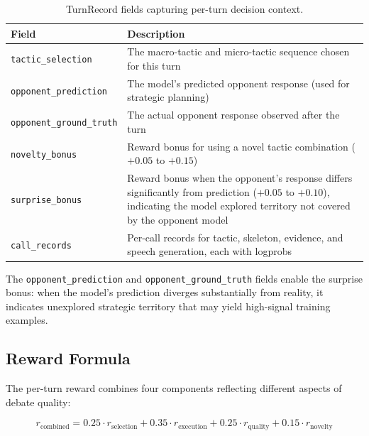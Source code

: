 \begin{table}[h]
\centering
\small
\begin{tabular}{lp{8cm}}
\toprule
\textbf{Field} & \textbf{Description} \\
\midrule
\texttt{tactic\_selection} & The macro-tactic and micro-tactic sequence chosen for this turn \\
\texttt{opponent\_prediction} & The model's predicted opponent response (used for strategic planning) \\
\texttt{opponent\_ground\_truth} & The actual opponent response observed after the turn \\
\texttt{novelty\_bonus} & Reward bonus for using a novel tactic combination ($+0.05$ to $+0.15$) \\
\texttt{surprise\_bonus} & Reward bonus when the opponent's response differs significantly from prediction ($+0.05$ to $+0.10$), indicating the model explored territory not covered by the opponent model \\
\texttt{call\_records} & Per-call records for tactic, skeleton, evidence, and speech generation, each with logprobs \\
\bottomrule
\end{tabular}
\caption{TurnRecord fields capturing per-turn decision context.}
\label{tab:turn_record}
\end{table}

The \texttt{opponent\_prediction} and \texttt{opponent\_ground\_truth}
fields enable the surprise bonus: when the model's prediction diverges
substantially from reality, it indicates unexplored strategic territory
that may yield high-signal training examples.

\subsection{Reward Formula}

The per-turn reward combines four components reflecting different aspects
of debate quality:

\begin{equation}
r_{\text{combined}} = 0.25 \cdot r_{\text{selection}} + 0.35 \cdot r_{\text{execution}} + 0.25 \cdot r_{\text{quality}} + 0.15 \cdot r_{\text{novelty}}
\label{eq:combined_reward}
\end{equation}


